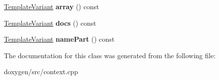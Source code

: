 \begin{DoxyCompactItemize}
\mbox{\label{class_argument_context_1_1_private_ac06905033d2b749bd8753cf9009c2273}} 
\mbox{\hyperlink{class_template_variant}{Template\+Variant}} {\bfseries array} () const
\item 
\mbox{\label{class_argument_context_1_1_private_ab1d13009bcc05bc09b6f94d6ad20f299}} 
\mbox{\hyperlink{class_template_variant}{Template\+Variant}} {\bfseries docs} () const
\item 
\mbox{\label{class_argument_context_1_1_private_a03699ff1aca248e87c2b9c073ea951f3}} 
\mbox{\hyperlink{class_template_variant}{Template\+Variant}} {\bfseries name\+Part} () const
\end{DoxyCompactItemize}


The documentation for this class was generated from the following file\+:\begin{DoxyCompactItemize}
\item 
doxygen/src/context.\+cpp\end{DoxyCompactItemize}
